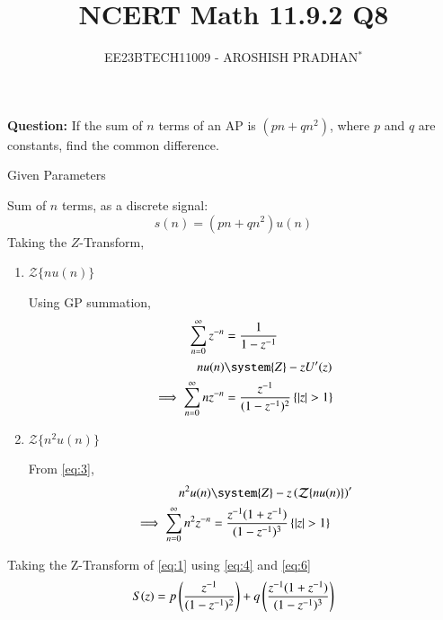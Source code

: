 \documentclass[journal,12pt,twocolumn]{IEEEtran}
\theoremstyle{remark}
\begin{document}

\vspace{3cm}

\title{NCERT Math 11.9.2 Q8}
\author{EE23BTECH11009 - AROSHISH PRADHAN$^{*}$%
}
\maketitle
\newpage
\bigskip
\textbf{Question:} If the sum of $n$ terms of an AP is $(pn + qn^2)$, where $p$ and $q$ are constants, find the common difference.

\solution
\begin{table}[!h]
    \centering
    
    \caption{Given Parameters}
    \label{tab:1}
\end{table}

Sum of $n$ terms, as a discrete signal:
\begin{equation}
    s(n) = (pn + qn^2)u(n) \label{eq:1}
\end{equation}
Taking the $Z$-Transform,
\begin{enumerate}
    \item $\mathcal{Z}\{nu(n)\}$

Using GP summation, 
\begin{align}
    \sum_{n = 0}^{\infty} z^{-n} &= \frac{1}{1 - z^{-1}}\\
    nu(n) &\system{Z} -zU'(z)\label{eq:3} \\ 
    \implies \sum_{n = 0}^{\infty} nz^{-n} &= \frac{z^{-1}}{(1-z^{-1})^2}\, \{\abs{z} > 1\} \label{eq:4}
\end{align}
\item $\mathcal{Z}{\{n^2 u(n)\}}$

From \eqref{eq:3},
    \begin{align}
        n^2 u(n) &\system{Z} -z\brak{\mathcal{Z}\{nu(n)\}}'\\
        \implies \sum_{n = 0}^{\infty} n^2 z^{-n} &= \frac{z^{-1}(1+z^{-1})}{(1-z^{-1})^3}\, \{\abs{z} > 1\} \label{eq:6}
    \end{align}
\end{enumerate}
Taking the Z-Transform of \eqref{eq:1} using \eqref{eq:4} and \eqref{eq:6}
\begin{align}
      S(z) = p\left(\frac{z^{-1}}{(1-z^{-1})^2}\right) + q\left(\frac{z^{-1}(1 + z^{-1})}{(1-z^{-1})^3}\right)
\end{align}
\end{document}
